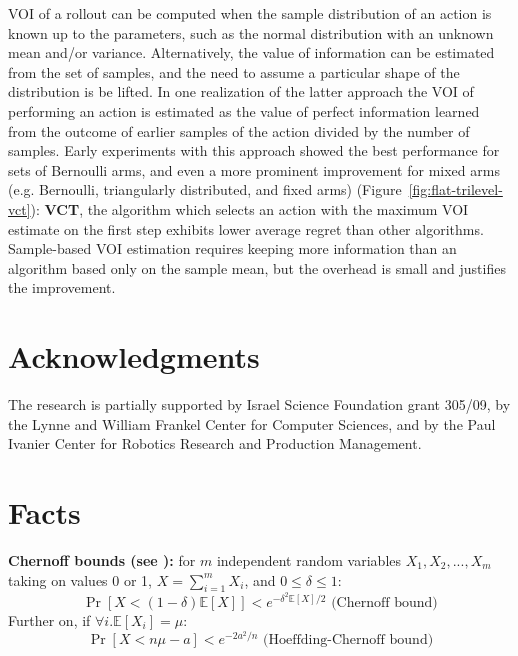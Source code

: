 \documentclass{article}
\newcommand {\IE} {\ensuremath {\mathbb{E}}}
\begin{document}
VOI of a rollout can be computed when the sample distribution of an
action is known up to the parameters, such as the normal distribution
with an unknown mean and/or variance. Alternatively, the value of
information can be estimated from the set of samples, and the need to
assume a particular shape of the distribution is be lifted. In one
realization of the latter approach the VOI of performing an action is
estimated as the value of perfect information learned from the outcome
of earlier samples of the action divided by the number of
samples. Early experiments with this approach showed the best
performance for sets of Bernoulli arms, and even a more prominent
improvement for mixed arms (e.g. Bernoulli, triangularly distributed,
and fixed arms) (Figure~\ref{fig:flat-trilevel-vct}):
\textbf{VCT}, the algorithm which selects an action with the maximum VOI estimate on
the first step exhibits lower average regret than other algorithms.
Sample-based VOI estimation requires keeping more information than an
algorithm based only on the sample mean, but the overhead is small and justifies
the improvement.

\section*{Acknowledgments}

The research is partially supported by Israel
Science Foundation grant 305/09, by the Lynne and William Frankel
Center for Computer Sciences, and by the Paul Ivanier Center for
Robotics Research and Production Management.

\clearpage
\appendix

\section{Facts}

{\bf Chernoff bounds (see \cite{Hagerup.chernoff}):} for $m$ independent random variables $X_1, X_2, ..., X_m$
taking on values 0 or 1, $X=\sum_{i=1}^m X_i$, and $0\le\delta\le 1$:
\begin{equation}
\Pr[X < (1-\delta)\IE[X]] < e^{-\delta^2\IE[X]/2} \mbox{ (Chernoff bound)}
\label{eq:chernoff-bound}
\end{equation}
Further on, if $\forall i. \IE[X_i]=\mu$:
\begin{equation}
\Pr[X < n\mu-a] <  e^{-2a^2/n}
\label{eq:chernoff-hoeffding-bound} \mbox{ (Hoeffding-Chernoff bound)}
\end{equation}
\end{document}
